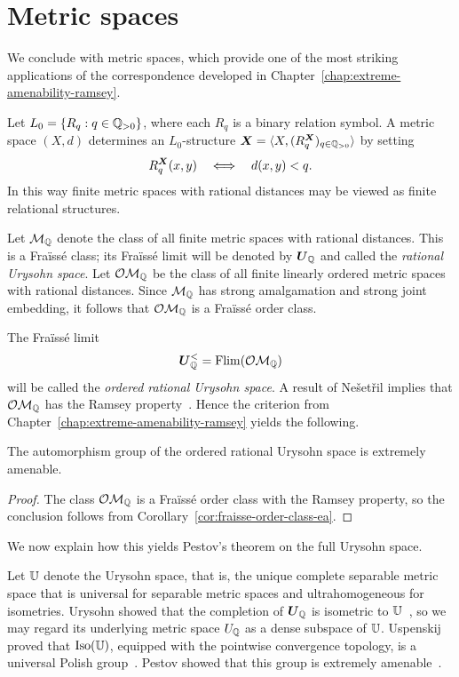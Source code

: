 \section{Metric spaces}

We conclude with metric spaces, which provide one of the most striking applications of the correspondence developed in Chapter~\ref{chap:extreme-amenability-ramsey}.

Let \(L_0=\{R_q : q\in \mathbb{Q}_{>0}\}\), where each \(R_q\) is a binary relation symbol. A metric space \((X,d)\) determines an \(L_0\)-structure \(\boldsymbol{X}=\langle X,(R_q^{\boldsymbol{X}})_{q\in \mathbb{Q}_{>0}}\rangle\) by setting
\[
    R_q^{\boldsymbol{X}}(x,y)
    \quad\Longleftrightarrow\quad
    d(x,y)<q.
\]
In this way finite metric spaces with rational distances may be viewed as finite relational structures.

Let \(\mathcal{M}_{\mathbb{Q}}\) denote the class of all finite metric spaces with rational distances. This is a Fraïssé class; its Fraïssé limit will be denoted by \(\boldsymbol{U}_{\mathbb{Q}}\) and called the \emph{rational Urysohn space}. Let \(\mathcal{OM}_{\mathbb{Q}}\) be the class of all finite linearly ordered metric spaces with rational distances. Since \(\mathcal{M}_{\mathbb{Q}}\) has strong amalgamation and strong joint embedding, it follows that \(\mathcal{OM}_{\mathbb{Q}}\) is a Fraïssé order class.

The Fraïssé limit
\[
    \boldsymbol{U}_{\mathbb{Q}}^{<}=\operatorname{Flim}(\mathcal{OM}_{\mathbb{Q}})
\]
will be called the \emph{ordered rational Urysohn space}. A result of Ne\v{s}et\v{r}il implies that \(\mathcal{OM}_{\mathbb{Q}}\) has the Ramsey property~\cite{N04}. Hence the criterion from Chapter~\ref{chap:extreme-amenability-ramsey} yields the following.

\begin{theorem}
    \label{thm:ordered-rational-urysohn-ea}
    The automorphism group of the ordered rational Urysohn space is extremely amenable.
\end{theorem}

\begin{proof}
    The class \(\mathcal{OM}_{\mathbb{Q}}\) is a Fraïssé order class with the Ramsey property, so the conclusion follows from Corollary~\ref{cor:fraisse-order-class-ea}.
\end{proof}

We now explain how this yields Pestov's theorem on the full Urysohn space.

Let \(\mathbb{U}\) denote the Urysohn space, that is, the unique complete separable metric space that is universal for separable metric spaces and ultrahomogeneous for isometries. Urysohn showed that the completion of \(\boldsymbol{U}_{\mathbb{Q}}\) is isometric to \(\mathbb{U}\)~\cite{U}, so we may regard its underlying metric space \(U_{\mathbb{Q}}\) as a dense subspace of \(\mathbb{U}\). Uspenskij proved that \(\operatorname{Iso}(\mathbb{U})\), equipped with the pointwise convergence topology, is a universal Polish group~\cite{Usp90}. Pestov showed that this group is extremely amenable~\cite{P02}.

